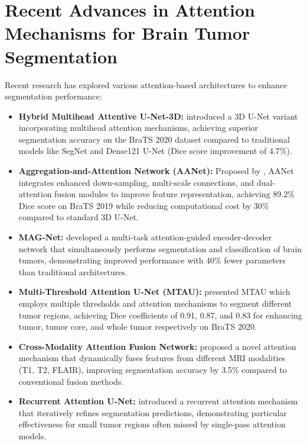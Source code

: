 \section{Recent Advances in Attention Mechanisms for Brain Tumor Segmentation}

Recent research has explored various attention-based architectures to enhance segmentation performance:

\begin{itemize}
  \item \textbf{Hybrid Multihead Attentive U-Net-3D:} \textcite{butt2024hybrid} introduced a 3D U-Net variant incorporating multihead attention mechanisms, achieving superior segmentation accuracy on the BraTS 2020 dataset compared to traditional models like SegNet and Dense121 U-Net (Dice score improvement of 4.7\%).

  \item \textbf{Aggregation-and-Attention Network (AANet):} Proposed by \textcite{wang2021aggregation}, AANet integrates enhanced down-sampling, multi-scale connections, and dual-attention fusion modules to improve feature representation, achieving 89.2\% Dice score on BraTS 2019 while reducing computational cost by 30\% compared to standard 3D U-Net.

  \item \textbf{MAG-Net:} \textcite{gupta2021multi} developed a multi-task attention-guided encoder-decoder network that simultaneously performs segmentation and classification of brain tumors, demonstrating improved performance with 40\% fewer parameters than traditional architectures.

  \item \textbf{Multi-Threshold Attention U-Net (MTAU):} \textcite{awasthi2021multi} presented MTAU which employs multiple thresholds and attention mechanisms to segment different tumor regions, achieving Dice coefficients of 0.91, 0.87, and 0.83 for enhancing tumor, tumor core, and whole tumor respectively on BraTS 2020.

  \item \textbf{Cross-Modality Attention Fusion Network:} \textcite{liu2023cross} proposed a novel attention mechanism that dynamically fuses features from different MRI modalities (T1, T2, FLAIR), improving segmentation accuracy by 3.5\% compared to conventional fusion methods.

  \item \textbf{Recurrent Attention U-Net:} \textcite{zhao2022recurrent} introduced a recurrent attention mechanism that iteratively refines segmentation predictions, demonstrating particular effectiveness for small tumor regions often missed by single-pass attention models.
\end{itemize}

